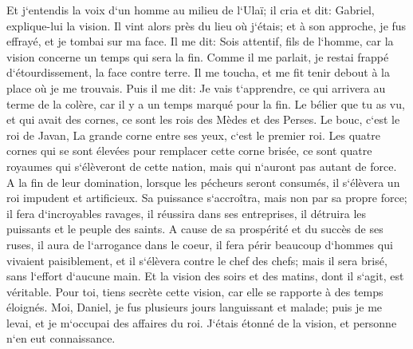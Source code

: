 \verse Et j`entendis la voix d`un homme au milieu de l`Ulaï; il cria et dit: Gabriel, explique-lui la vision. 
\verse Il vint alors près du lieu où j`étais; et à son approche, je fus effrayé, et je tombai sur ma face. Il me dit: Sois attentif, fils de l`homme, car la vision concerne un temps qui sera la fin. 
\verse Comme il me parlait, je restai frappé d`étourdissement, la face contre terre. Il me toucha, et me fit tenir debout à la place où je me trouvais. 
\verse Puis il me dit: Je vais t`apprendre, ce qui arrivera au terme de la colère, car il y a un temps marqué pour la fin. 
\verse Le bélier que tu as vu, et qui avait des cornes, ce sont les rois des Mèdes et des Perses. 
\verse Le bouc, c`est le roi de Javan, La grande corne entre ses yeux, c`est le premier roi. 
\verse Les quatre cornes qui se sont élevées pour remplacer cette corne brisée, ce sont quatre royaumes qui s`élèveront de cette nation, mais qui n`auront pas autant de force. 
\verse A la fin de leur domination, lorsque les pécheurs seront consumés, il s`élèvera un roi impudent et artificieux. 
\verse Sa puissance s`accroîtra, mais non par sa propre force; il fera d`incroyables ravages, il réussira dans ses entreprises, il détruira les puissants et le peuple des saints. 
\verse A cause de sa prospérité et du succès de ses ruses, il aura de l`arrogance dans le coeur, il fera périr beaucoup d`hommes qui vivaient paisiblement, et il s`élèvera contre le chef des chefs; mais il sera brisé, sans l`effort d`aucune main. 
\verse Et la vision des soirs et des matins, dont il s`agit, est véritable. Pour toi, tiens secrète cette vision, car elle se rapporte à des temps éloignés. 
\verse Moi, Daniel, je fus plusieurs jours languissant et malade; puis je me levai, et je m`occupai des affaires du roi. J`étais étonné de la vision, et personne n`en eut connaissance. 

